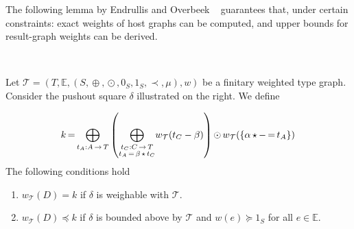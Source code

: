 The following lemma by Endrullis and Overbeek ~\cite{endrullis2024generalized_arxiv_v2} guarantees that, under certain constraints: exact weights of host graphs can be computed, and upper bounds for result-graph weights can be derived. 
\begin{lemma}
    \label{nwf:lem_4d13}
\ \newline
\begin{minipage}{0.7\textwidth}
    Let $\mathcal{T} \mathop{=} (T,\mathbb{E}, (S, \mathop{\oplus}, \mathop{\odot}, 0_S, 1_S, \prec, \mu), w)$ be a finitary weighted type graph. Consider the pushout square $\delta$ illustrated on the right. We define
\end{minipage}
\begin{minipage}{0.3\textwidth}
    \begin{center}{\normalfont
    }\end{center}
\end{minipage}
     \[k \mathop{=} \underset{t_A:A \mathop{\rightarrow} T}{\mathop{\bigoplus}}
            \left ( 
                \underset{\substack{t_C:C \mathop{\rightarrow} T\\
                                            t_A \mathop{=} \beta \mathop{\star} t_C }}{\mathop{\bigoplus}}
                        w_\mathcal{T}(t_C - \beta)     
                 \right ) 
            \mathop{\odot} 
                w_\mathcal{T}(\{\alpha \mathop{\star} - \mathop{=} t_A\})
    \]
    The following conditions hold
    \begin{enumerate}[label=(\Alph*)]
        \item  $w_\mathcal{T}(D)=k$ if $\delta$ is weighable with $\mathcal{T}$.
        \item  $w_\mathcal{T}(D)\mathop{\preceq} k$ if $\delta$ is bounded above by $\mathcal{T}$  and \(w(e) \mathop{\succeq} 1_S\) for all $e \mathop{\in} \mathbb{E}$.
    \end{enumerate}
\end{lemma}

